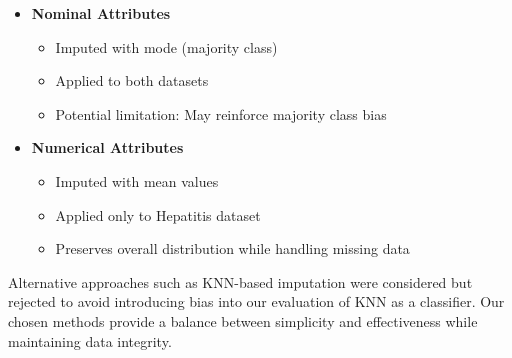 \begin{itemize}
    \item \textbf{Nominal Attributes}
    \begin{itemize}
        \item Imputed with mode (majority class)
        \item Applied to both datasets
        \item Potential limitation: May reinforce majority class bias
    \end{itemize}
    
    \item \textbf{Numerical Attributes}
    \begin{itemize}
        \item Imputed with mean values
        \item Applied only to Hepatitis dataset
        \item Preserves overall distribution while handling missing data
    \end{itemize}
\end{itemize}

Alternative approaches such as KNN-based imputation were considered but rejected to avoid introducing bias into our evaluation of KNN as a classifier. Our chosen methods provide a balance between simplicity and effectiveness while maintaining data integrity.


